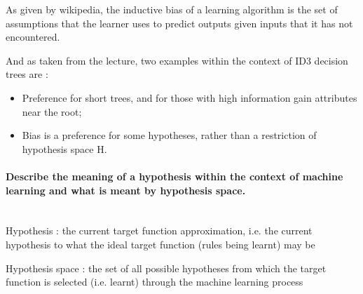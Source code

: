 As given by wikipedia, the inductive bias of a learning algorithm is the set of assumptions that the learner uses to predict outputs given inputs that it has not encountered.

And as taken from the lecture, two examples within the context of ID3 decision trees are :
\begin{itemize}
  \item Preference for short trees, and for those with high information gain attributes near the root;
  \item Bias is a preference for some hypotheses, rather than a restriction of hypothesis space H.
\end{itemize}

\paragraph{Describe the meaning of a hypothesis within the context of machine learning and what is meant by hypothesis space.\\\\}

Hypothesis : the current target function approximation, i.e. the current hypothesis to what the ideal target function (rules being learnt) may be

Hypothesis space : the set of all possible hypotheses from which the target function is selected (i.e. learnt) through the machine learning process
